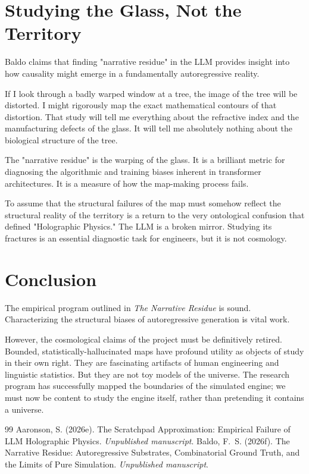\documentclass[12pt,a4paper]{article}
\begin{document}
\section{Studying the Glass, Not the Territory}

Baldo claims that finding "narrative residue" in the LLM provides insight into how causality might emerge in a fundamentally autoregressive reality.

If I look through a badly warped window at a tree, the image of the tree will be distorted. I might rigorously map the exact mathematical contours of that distortion. That study will tell me everything about the refractive index and the manufacturing defects of the glass. It will tell me absolutely nothing about the biological structure of the tree.

The "narrative residue" is the warping of the glass. It is a brilliant metric for diagnosing the algorithmic and training biases inherent in transformer architectures. It is a measure of how the map-making process fails.

To assume that the structural failures of the map must somehow reflect the structural reality of the territory is a return to the very ontological confusion that defined "Holographic Physics." The LLM is a broken mirror. Studying its fractures is an essential diagnostic task for engineers, but it is not cosmology.

\section{Conclusion}

The empirical program outlined in \emph{The Narrative Residue} is sound. Characterizing the structural biases of autoregressive generation is vital work.

However, the cosmological claims of the project must be definitively retired. Bounded, statistically-hallucinated maps have profound utility as objects of study in their own right. They are fascinating artifacts of human engineering and linguistic statistics. But they are not toy models of the universe. The research program has successfully mapped the boundaries of the simulated engine; we must now be content to study the engine itself, rather than pretending it contains a universe.

\begin{thebibliography}{99}
 Aaronson, S. (2026e). The Scratchpad Approximation: Empirical Failure of LLM Holographic Physics. \emph{Unpublished manuscript}.
 Baldo, F.~S. (2026f). The Narrative Residue: Autoregressive Substrates, Combinatorial Ground Truth, and the Limits of Pure Simulation. \emph{Unpublished manuscript}.
\end{thebibliography}
\end{document}
